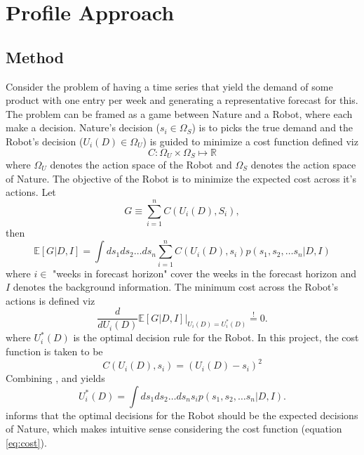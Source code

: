 \chapter{Profile Approach}

\section{Method}
\label{sec:method}
Consider the problem of having a time series that yield the demand of some product with one entry per week and generating a representative forecast for this. The problem can be framed as a game between Nature and a Robot, where each make a decision. Nature's decision ($s_i\in \Omega_S$) is to picks the true demand and the Robot's decision ($U_i(D)\in \Omega_U$) is guided to minimize a cost function defined viz 
\begin{equation}
	C:\Omega_U\times \Omega_S \mapsto \mathbb{R} 
\end{equation}
where $\Omega_U$ denotes the action space of the Robot and $\Omega_S$ denotes the action space of Nature. The objective of the Robot is to minimize the expected cost across it's actions. Let
\begin{equation}
	G\equiv \sum_{i=1}^n C(U_i(D),S_i),
\end{equation}
then
\begin{equation}
	\mathbb{E}[G|D,I] = \int ds_1ds_2\dots ds_n \sum_{i=1}^nC(U_i(D),s_i)p(s_1,s_2,\dots s_n|D,I)
	\label{eq:pen}
\end{equation}
where $i\in$ "weeks in forecast horizon" cover the weeks in the forecast horizon and $I$ denotes the background information. The minimum cost across the Robot's actions is defined viz
\begin{equation}
	\frac{d}{dU_i(D)}\mathbb{E}[G|D,I]\bigg|_{U_i(D) = U_i^*(D)} \stackrel{!}{=}0.
	\label{eq:crit}
\end{equation}
where $U^*_i(D)$ is the optimal decision rule for the Robot. In this project, the cost function is taken to be
\begin{equation}
	C(U_i(D),s_i) = (U_i(D)-s_i)^2
	\label{eq:cost}
\end{equation} 
Combining ,  and  yields 
\begin{equation}
	U^*_i(D) = \int ds_1ds_2\dots ds_n s_ip(s_1,s_2,\dots s_n|D,I).
	\label{eq:decision_rule}
\end{equation}
 informs that the optimal decisions for the Robot should be the expected decisions of Nature, which makes intuitive sense considering the cost function (equation \eqref{eq:cost}).


